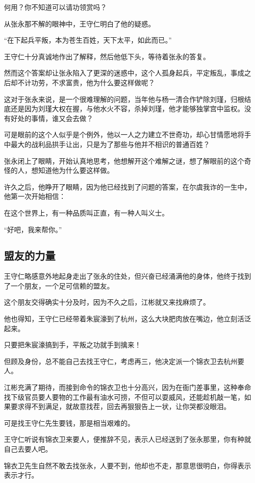\begin{multicols}{\theparacolNo}
		何用？你不知道可以请功领赏吗？

		从张永那不解的眼神中，王守仁明白了他的疑惑。

		“在下起兵平叛，本为苍生百姓，天下太平，如此而已。”

		王守仁十分真诚地作出了解释，然后他低下头，等待着张永的答复。

		然而这个答案却让张永陷入了更深的迷惑中，这个人孤身起兵，平定叛乱，事成之后却不计功劳，不求富贵，他为什么要这样做呢？

		这对于张永来说，是一个很难理解的问题，当年他与杨一清合作铲除刘瑾，归根结底还是因为刘瑾大权在握，与他水火不容，杀掉刘瑾，他才能够独掌宫中监权。没有好处的事情，谁又会去做？

		可是眼前的这个人似乎是个例外，他以一人之力建立不世奇功，却心甘情愿地将手中最大的战利品拱手让出，只是为了那些与他并不相识的普通百姓？

		张永闭上了眼睛，开始认真地思考，他想解开这个难解之谜，想了解眼前的这个奇怪的人，想知道他为什么要这样做。

		许久之后，他睁开了眼睛，因为他已经找到了问题的答案，在尔虞我诈的一生中，他第一次开始相信：

		在这个世界上，有一种品质叫正直，有一种人叫义士。

		“好吧，我来帮你。”

		\subsection{盟友的力量}
		王守仁略感意外地起身走出了张永的住处，但兴奋已经涌满他的身体，他终于找到了一个朋友，一个足可信赖的盟友。

		这个朋友交得确实十分及时，因为不久之后，江彬就又来找麻烦了。

		他也得知，王守仁已经带着朱宸濠到了杭州，这么大块肥肉放在嘴边，他立刻活泛起来。

		只要把朱宸濠搞到手，平叛之功就手到擒来！

		但顾及身份，总不能自己去找王守仁，考虑再三，他决定派一个锦衣卫去杭州要人。

		江彬充满了期待，而接到命令的锦衣卫也十分高兴，因为在衙门差事里，这种奉命找下级官员要人要物的工作最有油水可捞，不但可以耍威风，还能趁机敲一笔，如果要求得不到满足，就故意找茬，回去再狠狠告上一状，让你哭都没眼泪。

		可是找王守仁先生要钱，那是相当艰难的。

		王守仁听说有锦衣卫来要人，便推辞不见，表示人已经送到了张永那里，你有种就自己去要人吧。

		锦衣卫先生自然不敢去找张永，人要不到，他却也不走，那意思很明白，你得表示表示才行。


\end{multicols}
